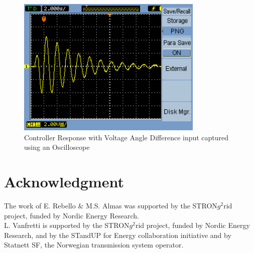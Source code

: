 \documentclass[conference]{IEEEtran}
\begin{document}
\begin{figure}[]
\centering
\includegraphics[width=3.5in]{Best_sample.png}
\caption{Controller Response with Voltage Angle Difference input captured using an Oscilloscope}
\label{ScopeCapture}
\end{figure}



\section*{Acknowledgment}
The work of E. Rebello \& M.S. Almas was supported by the STRON$g^{2}$rid project, funded by Nordic Energy Research.\\
L. Vanfretti is supported by the STRON$g^{2}$rid project, funded by Nordic Energy Research, and by the STandUP for Energy collaboration initiative and by Statnett SF, the Norwegian transmission system operator.

\end{document}
